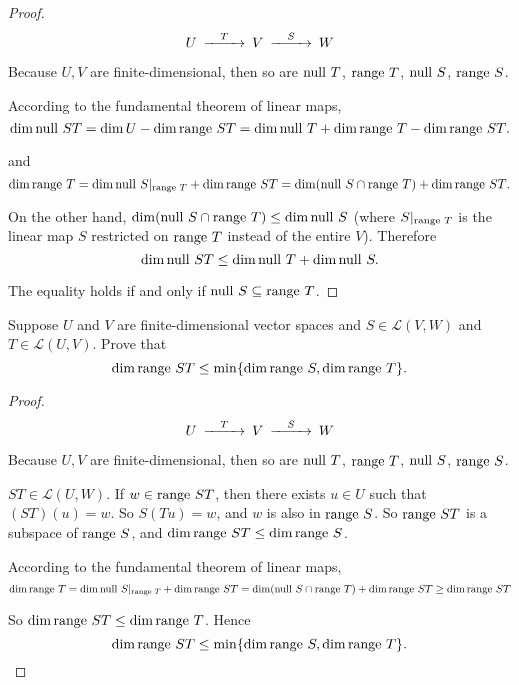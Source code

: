 \begin{proof}
    \[
        \begin{CD}
            U @>T>>     V @>S>>     W
        \end{CD}
    \]

    Because $U, V$ are finite-dimensional, then so are $\operatorname{null}\,{T}$, $\operatorname{range}\,{T}$, $\operatorname{null}\,{S}$, $\operatorname{range}\,{S}$.

    According to the fundamental theorem of linear maps,
    \[
        \dim\operatorname{null}\,{ST} = \dim U - \dim\operatorname{range}\,{ST} = \dim \operatorname{null}\,{T} + \dim\operatorname{range}\,{T} - \dim\operatorname{range}\,{ST}.
    \]

    and
    \[
        \dim\operatorname{range}\,{T} = \dim \operatorname{null}\,{S\vert_{\operatorname{range}\,{T}}} + \dim\operatorname{range}\,{ST} = \dim (\operatorname{null}\,{S}\cap\operatorname{range}\,{T}) + \dim\operatorname{range}\,{ST}.
    \]

    On the other hand, $\dim (\operatorname{null}\,{S}\cap\operatorname{range}\,{T}) \leq \dim\operatorname{null}\,{S}$ (where $S\vert_{\operatorname{range}\,{T}}$ is the linear map $S$ restricted on $\operatorname{range}\,{T}$ instead of the entire $V$). Therefore
    \[
        \dim\operatorname{null}\,{ST} \leq \dim\operatorname{null}\,{T} + \dim\operatorname{null}\,{S}.
    \]

    The equality holds if and only if $\operatorname{null}\,{S}\subseteq \operatorname{range}\,{T}$.
\end{proof}
\newpage

\begin{exercise}\label{chapter3:sectionB:exercise23}
    Suppose $U$ and $V$ are finite-dimensional vector spaces and $S \in \mathcal{L}(V, W)$ and $T \in \mathcal{L}(U, V)$. Prove that
    \[
        \dim\operatorname{range}\,{ST} \leq \min\{\dim\operatorname{range}\,{S}, \dim\operatorname{range}\,{T}\}.
    \]
\end{exercise}

\begin{proof}
    \[
        \begin{CD}
            U @>T>>     V @>S>>     W
        \end{CD}
    \]

    Because $U, V$ are finite-dimensional, then so are $\operatorname{null}\,{T}$, $\operatorname{range}\,{T}$, $\operatorname{null}\,{S}$, $\operatorname{range}\,{S}$.

    $ST\in\mathcal{L}(U, W)$. If $w\in\operatorname{range}\,{ST}$, then there exists $u\in U$ such that $(ST)(u) = w$. So $S(Tu) = w$, and $w$ is also in $\operatorname{range}\,{S}$. So $\operatorname{range}\,{ST}$ is a subspace of $\operatorname{range}\,{S}$, and $\dim\operatorname{range}\,{ST}\leq \dim\operatorname{range}\,{S}$.

    According to the fundamental theorem of linear maps,
    \[
        \dim\operatorname{range}\,{T} = \dim \operatorname{null}\,{S\vert_{\operatorname{range}\,{T}}} + \dim\operatorname{range}\,{ST} = \dim (\operatorname{null}\,{S}\cap\operatorname{range}\,{T}) + \dim\operatorname{range}\,{ST} \geq \dim\operatorname{range}\,{ST}
    \]

    So $\dim\operatorname{range}\,{ST}\leq \dim\operatorname{range}\,{T}$. Hence
    \[
        \dim\operatorname{range}\,{ST}\leq \min\{ \dim\operatorname{range}\,{S}, \dim\operatorname{range}\,{T} \}.\qedhere
    \]
\end{proof}
\newpage

